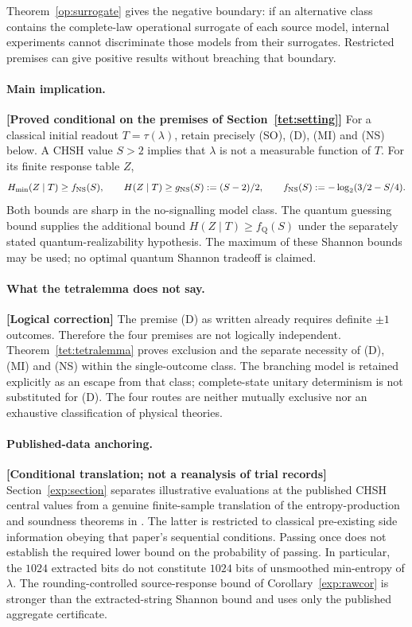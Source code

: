 \documentclass[11pt,a4paper]{article}
\theoremstyle{definition}
\theoremstyle{remark}\newtheorem{remark}[theorem]{Remark}
\newcommand{\status}[1]{\textbf{[#1]}\quad}
\newcommand{\fNS}{f_{\mathrm{NS}}}
\newcommand{\fQ}{f_{\mathrm{Q}}}
\begin{document}
Theorem~\ref{op:surrogate} gives the negative boundary: if an alternative class contains the complete-law operational surrogate of each source model, internal experiments cannot discriminate those models from their surrogates. Restricted premises can give positive results without breaching that boundary.

\paragraph{Main implication.}
\status{Proved conditional on the premises of Section~\ref{tet:setting}}
For a classical initial readout $T=\tau(\lambda)$, retain precisely (SO), (D), (MI) and (NS) below. A CHSH value $S>2$ implies that $\lambda$ is not a measurable function of $T$. For its finite response table $Z$,
\[
 H_{\min}(Z\mid T)\ge\fNS(S),\qquad
 H(Z\mid T)\ge g_{\rm NS}(S):=(S-2)/2,
 \qquad \fNS(S):=-\log_2(3/2-S/4).
\]
Both bounds are sharp in the no-signalling model class. The quantum guessing bound supplies the additional bound $H(Z\mid T)\ge\fQ(S)$ under the separately stated quantum-realizability hypothesis. The maximum of these Shannon bounds may be used; no optimal quantum Shannon tradeoff is claimed.

\paragraph{What the tetralemma does not say.}
\status{Logical correction}
The premise (D) as written already requires definite $\pm1$ outcomes. Therefore the four premises are not logically independent. Theorem~\ref{tet:tetralemma} proves exclusion and the separate necessity of (D), (MI) and (NS) within the single-outcome class. The branching model is retained explicitly as an escape from that class; complete-state unitary determinism is not substituted for (D). The four routes are neither mutually exclusive nor an exhaustive classification of physical theories.

\paragraph{Published-data anchoring.}
\status{Conditional translation; not a reanalysis of trial records}
Section~\ref{exp:section} separates illustrative evaluations at the published CHSH central values \cite{Hensen15,Rosenfeld17,Storz23} from a genuine finite-sample translation of the entropy-production and soundness theorems in \cite{Bierhorst18}. The latter is restricted to classical pre-existing side information obeying that paper's sequential conditions. Passing once does not establish the required lower bound on the probability of passing. In particular, the $1024$ extracted bits do not constitute $1024$ bits of unsmoothed min-entropy of $\lambda$. The rounding-controlled source-response bound of Corollary~\ref{exp:rawcor} is stronger than the extracted-string Shannon bound and uses only the published aggregate certificate.
\end{document}

